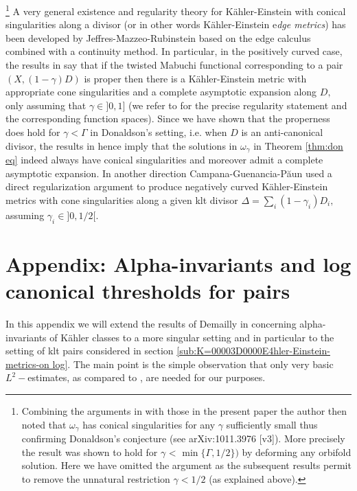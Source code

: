 \documentclass[11pt,oneside,english]{amsart}
\numberwithin{equation}{section}
\numberwithin{figure}{section}
\theoremstyle{plain}
\theoremstyle{plain}
\theoremstyle{plain}
\theoremstyle{plain}
\theoremstyle{remark}
\theoremstyle{definition}
\begin{document}
\footnote{Combining the arguments in \cite{do-3,br} with those in the present
paper the author then noted that $\omega_{\gamma}$ has conical singularities
for any $\gamma$ sufficiently small thus confirming Donaldson's conjecture
(see arXiv:1011.3976 {[}v3{]}). More precisely the result was shown
to hold for $\gamma$ < $\min\{\Gamma,1/2\})$ by deforming any orbifold
solution. Here we have omitted the argument as the subsequent results
\cite{jmr} permit to remove the unnatural restriction $\gamma<1/2$
(as explained above). } A very general existence and regularity theory for Kähler-Einstein
with conical singularities along a divisor (or in other words Kähler-Einstein
e\emph{dge metrics}) has been developed by Jeffres-Mazzeo-Rubinstein
\cite{jmr} based on the edge calculus combined with a continuity
method. In particular, in the positively curved case, the results
in \cite{jmr} say that if the twisted Mabuchi functional corresponding
to a pair $(X,(1-\gamma)D)$ is proper then there is a Kähler-Einstein
metric with appropriate cone singularities and a complete asymptotic
expansion along $D,$ only assuming that $\gamma\in]0,1]$ (we refer
to \cite{jmr} for the precise regularity statement and the corresponding
function spaces). Since we have shown that the properness does hold
for $\gamma<\Gamma$ in Donaldson's setting, i.e. when $D$ is an
anti-canonical divisor, the results in \cite{jmr} hence imply that
the solutions in $\omega_{\gamma}$ in Theorem \ref{thm:don eq} indeed
always have conical singularities and moreover admit a complete asymptotic
expansion. In another direction Campana-Guenancia-P\u{a}un \cite{cgh}
used a direct regularization argument to produce negatively curved
Kähler-Einstein metrics with cone singularities along a given klt
divisor $\Delta=\sum_{i}(1-\gamma_{i})D_{i},$ assuming $\gamma_{i}\in]0,1/2[.$

\section{Appendix: Alpha-invariants and log canonical thresholds for pairs}

In this appendix we will extend the results of Demailly in \cite{dem2}
concerning alpha-invariants of Kähler classes to a more singular setting
and in particular to the setting of klt pairs considered in section
\ref{sub:K=00003D0000E4hler-Einstein-metrics-on log}. The main point
is the simple observation that only very basic $L^{2}-$estimates,
as compared to \cite{dem2}, are needed for our purposes. 
\end{document}
